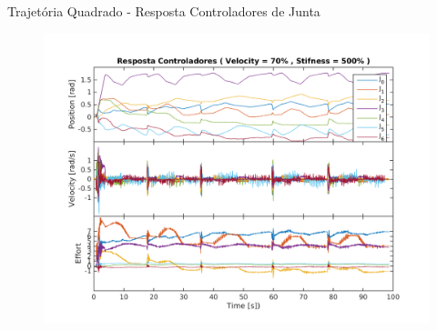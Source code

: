 \documentclass{beamer}
\begin{document}
\begin{frame}{Trajetória Quadrado - Resposta Controladores de Junta}
   \begin{figure}
    \centering
    \includegraphics[width = 0.9\linewidth]{tex/figs/squareStifff3stateEvalv70s500.png}
    \label{fig:mekademo}
\end{figure}
\end{frame}
\end{document}
